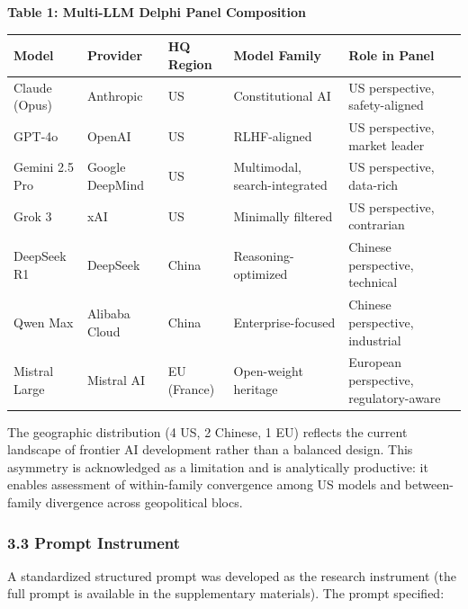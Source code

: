 \documentclass{article}
\begin{document}
\textbf{Table 1: Multi-LLM Delphi Panel Composition}

\begin{table}[htbp]
\centering
\begin{tabular}{lllll}
\toprule
\textbf{Model} & \textbf{Provider} & \textbf{HQ Region} & \textbf{Model Family} & \textbf{Role in Panel} \\
\midrule
Claude (Opus) & Anthropic & US & Constitutional AI & US perspective, safety-aligned \\
GPT-4o & OpenAI & US & RLHF-aligned & US perspective, market leader \\
Gemini 2.5 Pro & Google DeepMind & US & Multimodal, search-integrated & US perspective, data-rich \\
Grok 3 & xAI & US & Minimally filtered & US perspective, contrarian \\
DeepSeek R1 & DeepSeek & China & Reasoning-optimized & Chinese perspective, technical \\
Qwen Max & Alibaba Cloud & China & Enterprise-focused & Chinese perspective, industrial \\
Mistral Large & Mistral AI & EU (France) & Open-weight heritage & European perspective, regulatory-aware \\
\bottomrule
\end{tabular}
\end{table}

The geographic distribution (4 US, 2 Chinese, 1 EU) reflects the current landscape of frontier AI development rather than a balanced design. This asymmetry is acknowledged as a limitation and is analytically productive: it enables assessment of within-family convergence among US models and between-family divergence across geopolitical blocs.


\subsubsection{3.3 Prompt Instrument}
\label{sec:3_3_prompt_instrument}

A standardized structured prompt was developed as the research instrument (the full prompt is available in the supplementary materials). The prompt specified:
\end{document}
